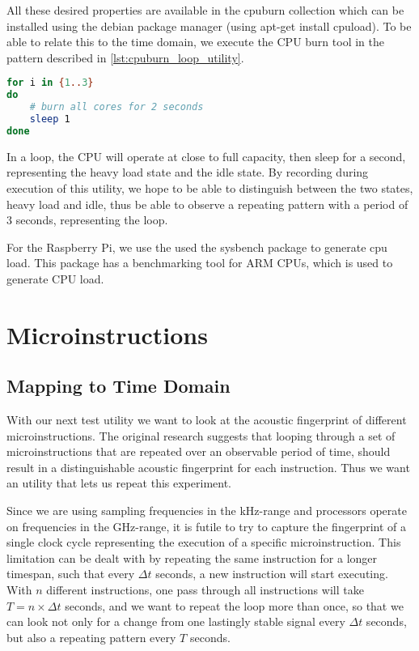 All these desired properties are available in the cpuburn collection which can be installed using the debian package manager (using
apt-get install cpuload). 
To be able to relate this to the time domain, we execute the CPU burn tool in the pattern described in \autoref{lst:cpuburn_loop_utility}.

\begin{lstlisting}[language=BASH, caption={Mapping execution to the time domain: CPU Burn Utility}, label={lst:cpuburn_loop_utility}]
for i in {1..3}
do
	# burn all cores for 2 seconds
	sleep 1
done
\end{lstlisting}

In a loop, the CPU will operate at close to full capacity, then sleep for a second, representing the heavy load state and the idle state.
By recording during execution of this utility, we hope to be able to distinguish between the two states, heavy load and idle, thus be able to observe a repeating pattern with a period of \(3\) seconds, representing the loop.

For the Raspberry Pi, we use the used the sysbench\cite{url:sysbench_wiki} package to generate cpu load. 
This package has a benchmarking tool for ARM CPUs, which is used to generate CPU load. 


\section{Microinstructions}\label{chp4:sec:microinstructions}

\subsection{Mapping to Time Domain}\label{chp4:sec:mapping_to_time_domain}
With our next test utility we want to look at the acoustic fingerprint of different microinstructions. 
The original  research suggests that looping through a set of microinstructions that are repeated over an observable period of time, should result in a distinguishable acoustic fingerprint for each instruction.
Thus we want an utility that lets us repeat this experiment. 

Since we are using sampling frequencies in the kHz-range and processors operate on frequencies in the GHz-range, it is futile to try to capture the fingerprint of a single clock cycle representing the execution of a specific microinstruction. 
This limitation can be dealt with by repeating the same instruction for a longer timespan, such that every \(\Delta t\) seconds, a new instruction will start executing.
With \(n\) different instructions, one pass through all instructions will take \(T = n \times \Delta t\) seconds, and we want to repeat the loop more than once, so that we can look not only for a change from one lastingly stable signal every \(\Delta t\) seconds, but also a repeating pattern every \(T\) seconds.

